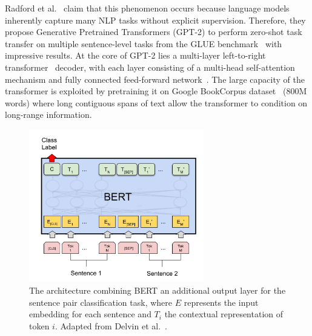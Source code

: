 Radford et al.~\cite{radford2019language} claim that this phenomenon occurs because language models inherently capture many NLP tasks without explicit supervision.
Therefore, they propose Generative Pretrained Transformers (GPT-2) to perform zero-shot task transfer on multiple sentence-level tasks from the GLUE benchmark~\cite{wang2018glue} with impressive results.
At the core of GPT-2 lies a multi-layer left-to-right transformer~\cite{vaswani2017attention} decoder, with each layer consisting of a multi-head self-attention mechanism and fully connected feed-forward network~\cite{radford2018improving}.
The large capacity of the transformer is exploited by pretraining it on Google BookCorpus dataset~\cite{zhu2015aligning} (800M words) where long contiguous spans of text allow the transformer to condition on long-range information.

\begin{figure}[b!]
\centering
  \includegraphics[width=3in]{bert.png}
\caption{The architecture combining BERT an additional output layer for the sentence pair classification task, where $ E $ represents the input embedding for each sentence and $ T_i $ the contextual representation of token $ i $. Adapted from Delvin et al.~\cite{devlin2018bert}.}
\label{fig:bert}
\end{figure}


